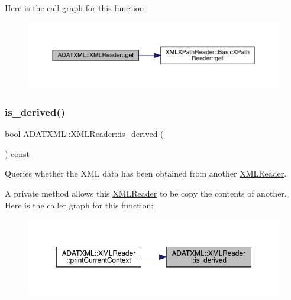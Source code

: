 Here is the call graph for this function\+:
\nopagebreak
\begin{figure}[H]
\begin{center}
\leavevmode
\includegraphics[width=350pt]{db/d3f/classADATXML_1_1XMLReader_ae3ba71a241315a5e90ba745fdc7e045b_cgraph}
\end{center}
\end{figure}
\mbox{\label{classADATXML_1_1XMLReader_a64fb149ae8809f993a7750aa5fe1f4b7}} 
\subsubsection{\texorpdfstring{is\_derived()}{is\_derived()}\hspace{0.1cm}{\footnotesize\ttfamily [1/2]}}
{\footnotesize\ttfamily bool A\+D\+A\+T\+X\+M\+L\+::\+X\+M\+L\+Reader\+::is\+\_\+derived (\begin{DoxyParamCaption}{ }\end{DoxyParamCaption}) const}



Queries whether the X\+ML data has been obtained from another \mbox{\hyperlink{classADATXML_1_1XMLReader}{X\+M\+L\+Reader}}. 

A private method allows this \mbox{\hyperlink{classADATXML_1_1XMLReader}{X\+M\+L\+Reader}} to be copy the contents of another. Here is the caller graph for this function\+:
\nopagebreak
\begin{figure}[H]
\begin{center}
\leavevmode
\includegraphics[width=350pt]{db/d3f/classADATXML_1_1XMLReader_a64fb149ae8809f993a7750aa5fe1f4b7_icgraph}
\end{center}
\end{figure}
\mbox{\label{classADATXML_1_1XMLReader_a64fb149ae8809f993a7750aa5fe1f4b7}} 

